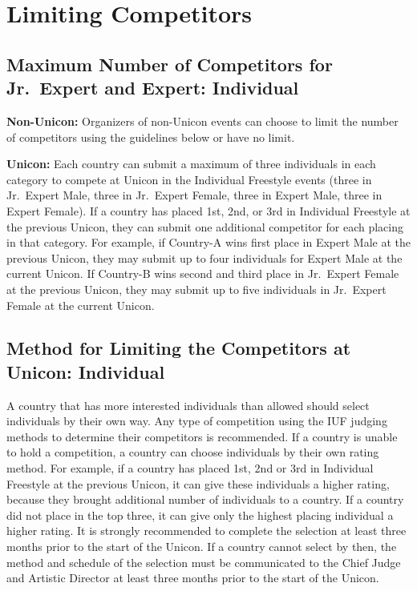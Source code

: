 \section{Limiting Competitors}

\subsection{Maximum Number of Competitors for Jr.~Expert and Expert: Individual}
\textbf{Non-Unicon:} Organizers of non-Unicon events can choose to limit the number of competitors using the guidelines below or have no limit.%

\textbf{Unicon:} Each country can submit a maximum of three individuals in each category to compete at Unicon in the Individual Freestyle events (three in Jr.~Expert Male, three in Jr.~Expert Female, three in Expert Male, three in Expert Female).
If a country has placed 1st, 2nd, or 3rd in Individual Freestyle at the previous Unicon, they can submit one additional competitor for each placing in that category.
For example, if Country-A wins first place in Expert Male at the previous Unicon, they may submit up to four individuals for Expert Male at the current Unicon.
If Country-B wins second and third place in Jr.~Expert Female at the previous Unicon, they may submit up to five individuals in Jr.~Expert Female at the current Unicon.

\subsection{Method for Limiting the Competitors at Unicon: Individual} %
A country that has more interested individuals than allowed should select individuals by their own way.
Any type of competition using the IUF judging methods to determine their competitors is recommended.
If a country is unable to hold a competition, a country can choose individuals by their own rating method.
For example, if a country has placed 1st, 2nd or 3rd in Individual Freestyle at the previous Unicon, it can give these individuals a higher rating, because they brought additional number of individuals to a country.
If a country did not place in the top three, it can give only the highest placing individual a higher rating.
It is strongly recommended to complete the selection at least three months prior to the start of the Unicon.
If a country cannot select by then, the method and schedule of the selection must be communicated to the Chief Judge and Artistic Director at least three months prior to the start of the Unicon.

